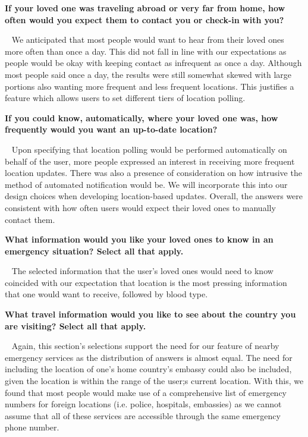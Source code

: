 \documentclass{scrreprt}
\begin{document}
\textbf{If your loved one was traveling abroad or very far from home, how often would you expect them to contact you or check-in with you?}
\par ~ We anticipated that most people would want to hear from their loved ones more often than once a day. This did not fall in line with our expectations as people would be okay with keeping contact as infrequent as once a day. Although most people said once a day, the results were still somewhat skewed with large portions also wanting more frequent and less frequent locations. This justifies a feature which allows users to set different tiers of location polling.


\textbf{If you could know, automatically, where your loved one was, how frequently would you want an up-to-date location?}
\par ~ Upon specifying that location polling would be performed automatically on behalf of the user, more people expressed an interest in receiving more frequent location updates. There was also a presence of consideration on how intrusive the method of automated notification would be. We will incorporate this into our design choices when developing location-based updates. Overall, the answers were consistent with how often users would expect their loved ones to manually contact them. 

\textbf{What information would you like your loved ones to know in an emergency situation? Select all that apply.}
\par ~ The selected information that the user's loved ones would need to know coincided with our expectation that location is the most pressing information that one would want to receive, followed by blood type.

\textbf{What travel information would you like to see about the country you are visiting? Select all that apply.}
\par ~ Again, this section's selections support the need for our feature of nearby emergency services as the distribution of answers is almost equal. The need for including the location of one's home country's embassy could also be included, given the location is within the range of the user;s current location. With this, we found that most people would make use of a comprehensive list of emergency numbers for foreign locations (i.e. police, hospitals, embassies) as we cannot assume that all of these services are accessible through the same emergency phone number.
\end{document}
